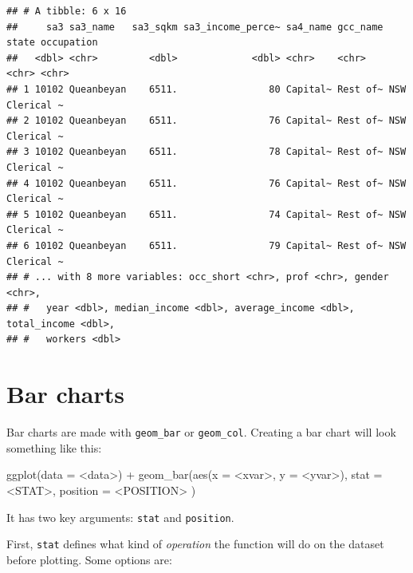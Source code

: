 \documentclass[
]{book}
\newenvironment{Shaded}{\begin{snugshade}}{\end{snugshade}}
\newcommand{\AttributeTok}[1]{\textcolor[rgb]{0.77,0.63,0.00}{#1}}
\newcommand{\FunctionTok}[1]{\textcolor[rgb]{0.00,0.00,0.00}{#1}}
\newcommand{\NormalTok}[1]{#1}
\newcommand{\SpecialCharTok}[1]{\textcolor[rgb]{0.00,0.00,0.00}{#1}}
\begin{document}
\begin{verbatim}
## # A tibble: 6 x 16
##     sa3 sa3_name   sa3_sqkm sa3_income_perce~ sa4_name gcc_name state occupation
##   <dbl> <chr>         <dbl>             <dbl> <chr>    <chr>    <chr> <chr>     
## 1 10102 Queanbeyan    6511.                80 Capital~ Rest of~ NSW   Clerical ~
## 2 10102 Queanbeyan    6511.                76 Capital~ Rest of~ NSW   Clerical ~
## 3 10102 Queanbeyan    6511.                78 Capital~ Rest of~ NSW   Clerical ~
## 4 10102 Queanbeyan    6511.                76 Capital~ Rest of~ NSW   Clerical ~
## 5 10102 Queanbeyan    6511.                74 Capital~ Rest of~ NSW   Clerical ~
## 6 10102 Queanbeyan    6511.                79 Capital~ Rest of~ NSW   Clerical ~
## # ... with 8 more variables: occ_short <chr>, prof <chr>, gender <chr>,
## #   year <dbl>, median_income <dbl>, average_income <dbl>, total_income <dbl>,
## #   workers <dbl>
\end{verbatim}

\hypertarget{bar-charts}{%
\section{Bar charts}\label{bar-charts}}

Bar charts are made with \texttt{geom\_bar} or \texttt{geom\_col}. Creating a bar chart will look something like this:

\begin{Shaded}
\begin{Highlighting}[]
\FunctionTok{ggplot}\NormalTok{(}\AttributeTok{data =} \SpecialCharTok{\textless{}}\NormalTok{data}\SpecialCharTok{\textgreater{}}\NormalTok{) }\SpecialCharTok{+} 
  \FunctionTok{geom\_bar}\NormalTok{(}\FunctionTok{aes}\NormalTok{(}\AttributeTok{x =} \SpecialCharTok{\textless{}}\NormalTok{xvar}\SpecialCharTok{\textgreater{}}\NormalTok{, }\AttributeTok{y =} \SpecialCharTok{\textless{}}\NormalTok{yvar}\SpecialCharTok{\textgreater{}}\NormalTok{),}
     \AttributeTok{stat =} \SpecialCharTok{\textless{}}\NormalTok{STAT}\SpecialCharTok{\textgreater{}}\NormalTok{, }
     \AttributeTok{position =} \SpecialCharTok{\textless{}}\NormalTok{POSITION}\SpecialCharTok{\textgreater{}}
\NormalTok{  )}
\end{Highlighting}
\end{Shaded}

It has two key arguments: \texttt{stat} and \texttt{position}.

First, \texttt{stat} defines what kind of \emph{operation} the function will do on the dataset before plotting. Some options are:
\end{document}

